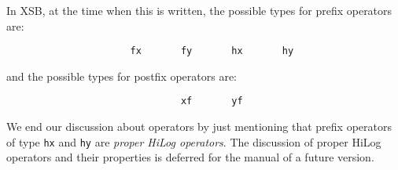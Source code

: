 In XSB, at the time when this is written, the possible types for
prefix operators are:
\begin{verbatim}
                      fx       fy       hx       hy
\end{verbatim}
and the possible types for postfix operators are:
\begin{verbatim}
                               xf       yf
\end{verbatim}

We end our discussion about operators by just mentioning that prefix operators
of type {\tt hx} and {\tt hy} are {\em proper HiLog operators}.  The discussion 
of proper HiLog operators and their properties is deferred for the manual
of a future version.

